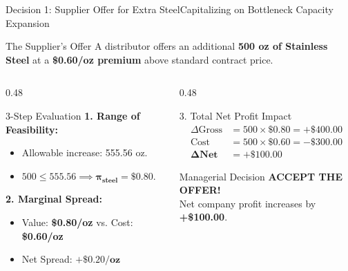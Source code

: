 \documentclass{beamer}
\begin{document}
\begin{frame}{Decision 1: Supplier Offer for Extra Steel}{Capitalizing on Bottleneck Capacity Expansion}
    \begin{block}{The Supplier's Offer}
        \small
        A distributor offers an additional \textbf{500 oz of Stainless Steel} at a \textbf{\$0.60/oz premium} above standard contract price.
    \end{block}
    \vspace{-0.2em}
    \begin{columns}[T]
        \begin{column}{0.48\textwidth}
            \begin{block}{3-Step Evaluation}
                \textbf{1. Range of Feasibility:}
                \begin{itemize}\setlength{\itemsep}{0.1em}
                    \item Allowable increase: 555.56 oz.
                    \item $500 \le 555.56 \implies \mathbf{\pi_{\text{steel}} = \$0.80}$.
                \end{itemize}
                \vspace{0.2em}
                \textbf{2. Marginal Spread:}
                \begin{itemize}\setlength{\itemsep}{0.1em}
                    \item Value: \textbf{\$0.80/oz} vs. Cost: \textbf{\$0.60/oz}
                    \item Net Spread: $\mathbf{+\$0.20 / \text{oz}}$
                \end{itemize}
            \end{block}
        \end{column}
        \begin{column}{0.48\textwidth}
            \begin{exampleblock}{3. Total Net Profit Impact}
                \small
                \begin{align*}
                \Delta \text{Gross} &= 500 \times \$0.80 = +\$400.00 \\
                \text{Cost}         &= 500 \times \$0.60 = -\$300.00 \\
                \mathbf{\Delta \text{Net}} &= \mathbf{+\$100.00}
                \end{align*}
            \end{exampleblock}
            \vspace{-0.2em}
            \begin{alertblock}{Managerial Decision}
                \centering \small
                \textbf{ACCEPT THE OFFER!}\\
                Net company profit increases by \textbf{+\$100.00}.
            \end{alertblock}
        \end{column}
    \end{columns}
\end{frame}
\end{document}
